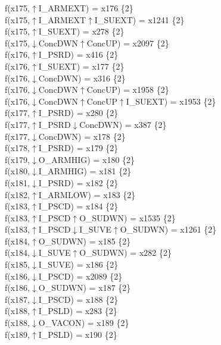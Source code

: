 f(x175,$\uparrow$I\_ARMEXT) = x176 \{2\} \\  
f(x175,$\uparrow$I\_ARMEXT$\uparrow$I\_SUEXT) = x1241 \{2\} \\  
f(x175,$\uparrow$I\_SUEXT) = x278 \{2\} \\  
f(x175,$\downarrow$ConcDWN$\uparrow$ConcUP) = x2097 \{2\} \\  
f(x176,$\uparrow$I\_PSRD) = x416 \{2\} \\  
f(x176,$\uparrow$I\_SUEXT) = x177 \{2\} \\  
f(x176,$\downarrow$ConcDWN) = x316 \{2\} \\  
f(x176,$\downarrow$ConcDWN$\uparrow$ConcUP) = x1958 \{2\} \\  
f(x176,$\downarrow$ConcDWN$\uparrow$ConcUP$\uparrow$I\_SUEXT) = x1953 \{2\} \\  
f(x177,$\uparrow$I\_PSRD) = x280 \{2\} \\  
f(x177,$\uparrow$I\_PSRD$\downarrow$ConcDWN) = x387 \{2\} \\  
f(x177,$\downarrow$ConcDWN) = x178 \{2\} \\  
f(x178,$\uparrow$I\_PSRD) = x179 \{2\} \\  
f(x179,$\downarrow$O\_ARMHIG) = x180 \{2\} \\  
f(x180,$\downarrow$I\_ARMHIG) = x181 \{2\} \\  
f(x181,$\downarrow$I\_PSRD) = x182 \{2\} \\  
f(x182,$\uparrow$I\_ARMLOW) = x183 \{2\} \\  
f(x183,$\uparrow$I\_PSCD) = x184 \{2\} \\  
f(x183,$\uparrow$I\_PSCD$\uparrow$O\_SUDWN) = x1535 \{2\} \\  
f(x183,$\uparrow$I\_PSCD$\downarrow$I\_SUVE$\uparrow$O\_SUDWN) = x1261 \{2\} \\  
f(x184,$\uparrow$O\_SUDWN) = x185 \{2\} \\  
f(x184,$\downarrow$I\_SUVE$\uparrow$O\_SUDWN) = x282 \{2\} \\  
f(x185,$\downarrow$I\_SUVE) = x186 \{2\} \\  
f(x186,$\downarrow$I\_PSCD) = x2089 \{2\} \\  
f(x186,$\downarrow$O\_SUDWN) = x187 \{2\} \\  
f(x187,$\downarrow$I\_PSCD) = x188 \{2\} \\  
f(x188,$\uparrow$I\_PSLD) = x283 \{2\} \\  
f(x188,$\downarrow$O\_VACON) = x189 \{2\} \\  
f(x189,$\uparrow$I\_PSLD) = x190 \{2\} \\  
